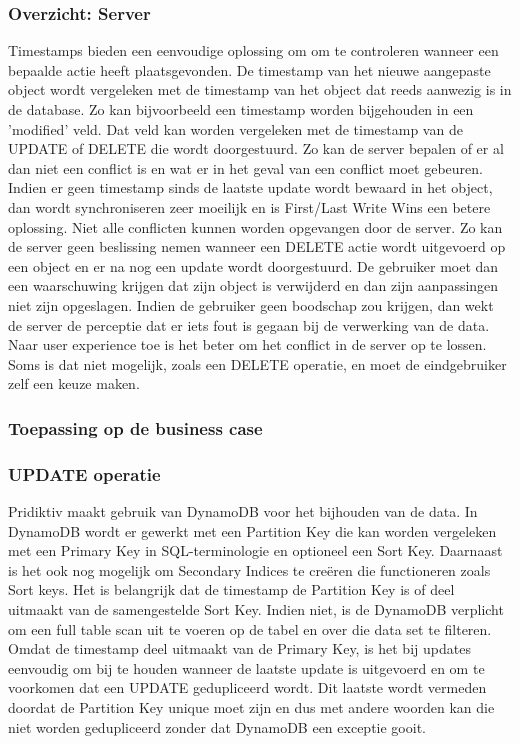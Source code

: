 \subsubsection{Overzicht: Server}
Timestamps bieden een eenvoudige oplossing om om te  controleren wanneer een bepaalde actie heeft plaatsgevonden. De timestamp van het nieuwe aangepaste object wordt vergeleken met de timestamp van het object dat reeds aanwezig is in de database. Zo kan bijvoorbeeld een timestamp worden bijgehouden in een 'modified' veld. Dat veld kan worden vergeleken met de timestamp van de UPDATE of DELETE die wordt doorgestuurd. Zo kan de server bepalen of er al dan niet een conflict is en wat er in het geval van een conflict moet gebeuren. Indien er geen timestamp sinds de laatste update wordt bewaard in het object, dan wordt synchroniseren zeer moeilijk en is First/Last Write Wins een betere oplossing. Niet alle conflicten kunnen worden opgevangen door de server. Zo kan de server geen beslissing nemen wanneer een DELETE actie wordt uitgevoerd op een object en er na nog een update wordt doorgestuurd. De gebruiker moet dan een waarschuwing krijgen dat zijn object is verwijderd en dan zijn aanpassingen niet zijn opgeslagen. Indien de gebruiker geen boodschap zou krijgen, dan wekt de server de perceptie dat er iets fout is gegaan bij de verwerking van de data. Naar user experience toe is het beter om het conflict in de server op te lossen. Soms is dat niet mogelijk, zoals een DELETE operatie, en moet de eindgebruiker zelf een keuze maken.
\subsubsection{Toepassing op de business case}
\subsubsection{UPDATE operatie}
Pridiktiv maakt gebruik van DynamoDB voor het bijhouden van de data. In DynamoDB wordt er gewerkt met een Partition Key die kan worden vergeleken met een Primary Key in SQL-terminologie en optioneel een Sort Key. Daarnaast is het ook nog mogelijk om Secondary Indices te cre\"eren die functioneren zoals Sort keys.  Het is belangrijk dat de timestamp de Partition Key is of deel uitmaakt van de samengestelde Sort Key. Indien niet, is de DynamoDB verplicht om een full table scan uit te voeren op de tabel en over die data set te filteren. Omdat de timestamp deel uitmaakt van de Primary Key, is het bij updates eenvoudig om bij te houden wanneer de laatste update is uitgevoerd en om te voorkomen dat een UPDATE gedupliceerd wordt. Dit laatste wordt vermeden doordat de Partition Key unique moet zijn en dus met andere woorden kan die niet worden gedupliceerd zonder dat DynamoDB een exceptie gooit.
